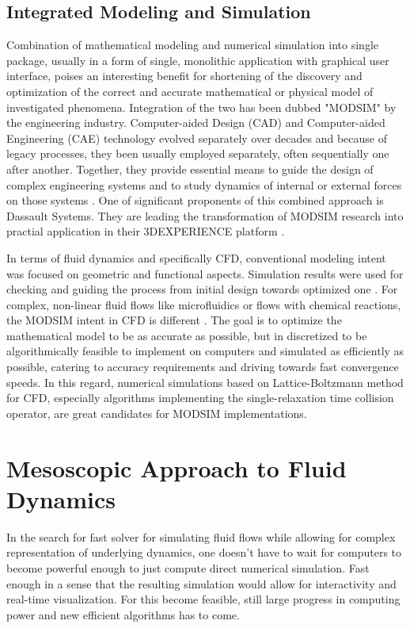 \subsection{Integrated Modeling and Simulation}
Combination of mathematical modeling and numerical simulation into single package, usually in a form of single, monolithic application with graphical user interface, poises an interesting benefit for shortening of the discovery and optimization of the correct and accurate mathematical or physical model of investigated phenomena. Integration of the two has been dubbed "MODSIM" by the engineering industry. Computer-aided Design (CAD) and Computer-aided Engineering (CAE) technology evolved separately over decades and because of legacy processes, they been usually employed separately, often sequentially one after another. Together, they provide essential means to guide the design of complex engineering systems and to study dynamics of internal or external forces on those systems \citep{mahmoodIntegratedModelingSimulation2019}. One of significant proponents of this combined approach is Dassault Systems. They are leading the transformation of MODSIM research into practial application in their 3DEXPERIENCE platform \citep{systemsExperienceYourDesign2019}. 

In terms of fluid dynamics and specifically CFD, conventional modeling intent was focused on geometric and functional aspects. Simulation results were used for checking and guiding the process from initial design towards optimized one  \citep{liAssociationDesignSimulation2016}. For complex, non-linear fluid flows like microfluidics or flows with chemical reactions, the MODSIM intent in CFD is different \citep{zhangLatticeBoltzmannMethod2011}. The goal is to optimize the mathematical model to be as accurate as possible, but in discretized to be algorithmically feasible to implement on computers and simulated as efficiently as possible, catering to accuracy requirements and driving towards fast convergence speeds. In this regard, numerical simulations based on Lattice-Boltzmann method for CFD, especially algorithms implementing the single-relaxation time collision operator, are great candidates for MODSIM implementations. 


\section{Mesoscopic Approach to Fluid Dynamics}\label{sec:meso}
In the search for fast solver for simulating fluid flows while allowing for complex representation of underlying dynamics, one doesn't have to wait for computers to become powerful enough to just compute direct numerical simulation. Fast enough in a sense that the resulting simulation would allow for interactivity and real-time visualization. For this become feasible, still large progress in computing power and new efficient algorithms has to come.

